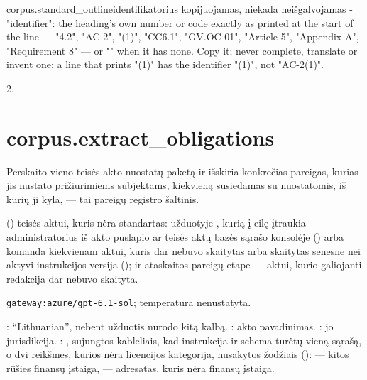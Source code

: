\par\nopagebreak
\begin{promptexcerpt}{corpus.standard_outline}{identifikatorius kopijuojamas, niekada neišgalvojamas}
- "identifier": the heading's own number or code exactly as printed at the
  start of the line — "4.2", "AC-2", "(1)", "CC6.1", "GV.OC-01", "Article 5",
  "Appendix A", "Requirement 8" — or "" when it has none. Copy it; never
  complete, translate or invent one: a line that prints "(1)" has the
  identifier "(1)", not "AC-2(1)".
\end{promptexcerpt}

 2.


\section{corpus.extract\_obligations}\label{sec:aprompts:corpus-extract_obligations}

 Perskaito vieno teisės akto nuostatų paketą ir išskiria konkrečias
pareigas, kurias jis nustato prižiūrimiems subjektams, kiekvieną susiedamas su nuostatomis, iš
kurių ji kyla, --- tai pareigų registro šaltinis.

  () teisės
aktui, kuris nėra standartas: užduotyje , kurią į eilę įtraukia
administratorius iš akto puslapio ar teisės aktų bazės sąrašo konsolėje
() arba komanda
 kiekvienam aktui, kuris dar nebuvo skaitytas arba skaitytas senesne
nei aktyvi instrukcijos versija (); ir ataskaitos pareigų etape --- aktui, kurio
galiojanti redakcija dar nebuvo skaityta.

 \texttt{gateway:azure/gpt-6.1-sol}; temperatūra
nenustatyta.

 : \enquote{Lithuanian}, nebent užduotis nurodo kitą
kalbą. : akto pavadinimas. : jo jurisdikcija.
: , sujungtos kableliais, kad instrukcija ir
schema turėtų vieną sąrašą, o dvi reikšmės, kurios nėra licencijos kategorija, nusakytos
žodžiais ():  --- kitos rūšies finansų įstaiga,
 --- adresatas, kuris nėra finansų įstaiga.

